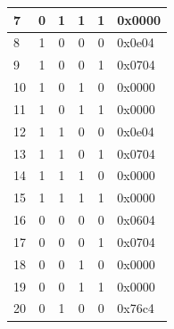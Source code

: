 \begin{table}[]
\begin{tabular}{|l|c|c|c|c|l|}
7                            & 0                       & 1                & 1                & 1                   & 0x0000                         \\ \hline
8                            & 1                       & 0                & 0                & 0                   & 0x0e04                         \\ \hline
9                            & 1                       & 0                & 0                & 1                   & 0x0704                         \\ \hline
10                           & 1                       & 0                & 1                & 0                   & 0x0000                         \\ \hline
11                           & 1                       & 0                & 1                & 1                   & 0x0000                         \\ \hline
12                           & 1                       & 1                & 0                & 0                   & 0x0e04                         \\ \hline
13                           & 1                       & 1                & 0                & 1                   & 0x0704                         \\ \hline
14                           & 1                       & 1                & 1                & 0                   & 0x0000                         \\ \hline
15                           & 1                       & 1                & 1                & 1                   & 0x0000                         \\ \hline
16                           & 0                       & 0                & 0                & 0                   & 0x0604                         \\ \hline
17                           & 0                       & 0                & 0                & 1                   & 0x0704                         \\ \hline
18                           & 0                       & 0                & 1                & 0                   & 0x0000                         \\ \hline
19                           & 0                       & 0                & 1                & 1                   & 0x0000                         \\ \hline
20                           & 0                       & 1                & 0                & 0                   & 0x76c4                         \\ \hline

\end{tabular}
\end{table}
